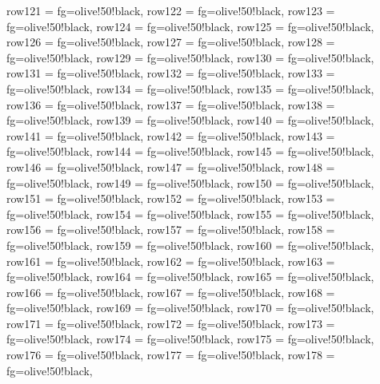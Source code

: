 \documentclass{article}
\begin{document}
\begin{tblr}
{             row{121} = {fg=olive!50!black},
             row{122} = {fg=olive!50!black},
             row{123} = {fg=olive!50!black},
             row{124} = {fg=olive!50!black},
             row{125} = {fg=olive!50!black},
             row{126} = {fg=olive!50!black},
             row{127} = {fg=olive!50!black},
             row{128} = {fg=olive!50!black},
             row{129} = {fg=olive!50!black},
             row{130} = {fg=olive!50!black},
             row{131} = {fg=olive!50!black},
             row{132} = {fg=olive!50!black},
             row{133} = {fg=olive!50!black},
             row{134} = {fg=olive!50!black},
             row{135} = {fg=olive!50!black},
             row{136} = {fg=olive!50!black},
             row{137} = {fg=olive!50!black},
             row{138} = {fg=olive!50!black},
             row{139} = {fg=olive!50!black},
             row{140} = {fg=olive!50!black},
             row{141} = {fg=olive!50!black},
             row{142} = {fg=olive!50!black},
             row{143} = {fg=olive!50!black},
             row{144} = {fg=olive!50!black},
             row{145} = {fg=olive!50!black},
             row{146} = {fg=olive!50!black},
             row{147} = {fg=olive!50!black},
             row{148} = {fg=olive!50!black},
             row{149} = {fg=olive!50!black},
             row{150} = {fg=olive!50!black},
             row{151} = {fg=olive!50!black},
             row{152} = {fg=olive!50!black},
             row{153} = {fg=olive!50!black},
             row{154} = {fg=olive!50!black},
             row{155} = {fg=olive!50!black},
             row{156} = {fg=olive!50!black},
             row{157} = {fg=olive!50!black},
             row{158} = {fg=olive!50!black},
             row{159} = {fg=olive!50!black},
             row{160} = {fg=olive!50!black},
             row{161} = {fg=olive!50!black},
             row{162} = {fg=olive!50!black},
             row{163} = {fg=olive!50!black},
             row{164} = {fg=olive!50!black},
             row{165} = {fg=olive!50!black},
             row{166} = {fg=olive!50!black},
             row{167} = {fg=olive!50!black},
             row{168} = {fg=olive!50!black},
             row{169} = {fg=olive!50!black},
             row{170} = {fg=olive!50!black},
             row{171} = {fg=olive!50!black},
             row{172} = {fg=olive!50!black},
             row{173} = {fg=olive!50!black},
             row{174} = {fg=olive!50!black},
             row{175} = {fg=olive!50!black},
             row{176} = {fg=olive!50!black},
             row{177} = {fg=olive!50!black},
             row{178} = {fg=olive!50!black},
}
\end{tblr}
\end{document}
